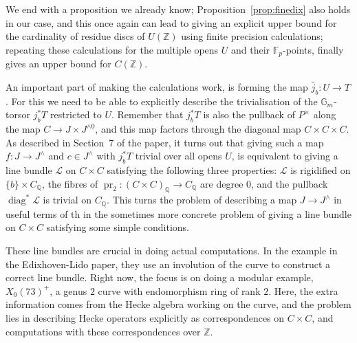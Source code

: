 \documentclass[12pt]{article}
\newcommand{\Z}{\mathbb{Z}}
\renewcommand{\G}{\mathbb{G}}
\newcommand{\Q}{\mathbb{Q}}
\newcommand{\Lcal}{\mathcal{L}}
\newcommand{\F}{\mathbb{F}}
\DeclareMathOperator{\pr}{pr}
\DeclareMathOperator{\diag}{diag}
\theoremstyle{plain}
\theoremstyle{definition}
\theoremstyle{remark}
\begin{document}
We end with a proposition we already know; Proposition~\ref{prop:finedix} also holds in our case, and this once again can lead to giving an explicit upper bound for the cardinality of residue discs of $U(\Z)$ using finite precision calculations; repeating these calculations for the multiple opens $U$ and their $\F_p$-points, finally gives an upper bound for $C(\Z)$.

An important part of making the calculations work, is forming the map $\tilde{j_b}: U \to T$. For this we need to be able to explicitly describe the trivialisation of the $\G_m$-torsor $j_b^* T$ restricted to $U$. Remember that $j_b^* T$ is also the pullback of $P^\times$ along the map $C \to J \times J^{\wedge 0}$, and this map factors through the diagonal map $C \times C\times C$. As described in Section~7 of the paper, it turns out that giving such a map $f: J \to J^{\wedge}$ and $c \in J^\wedge$ with $j_b^* T$ trivial over all opens $U$, is equivalent to giving a line bundle $\Lcal$ on $C \times C$ satisfying the following three properties: $\Lcal$ is rigidified on $\{b\} \times C_\Q$, the fibres of $\pr_2: (C \times C)_\Q \to C_\Q$ are degree $0$, and the pullback $\diag^* \Lcal$ is trivial on $C_\Q$. This turns the problem of describing a map $J \to J^\wedge$ in useful terms of th in the sometimes more concrete problem of giving a line bundle on $C \times C$ satisfying some simple conditions.

These line bundles are crucial in doing actual computations. In the example in the Edixhoven-Lido paper, they use an involution of the curve to construct a correct line bundle. Right now, the focus is on doing a modular example, $X_0(73)^+$, a genus $2$ curve with endomorphism ring of rank $2$. Here, the extra information comes from the Hecke algebra working on the curve, and the problem lies in describing Hecke operators explicitly as correspondences on $C \times C$, and computations with these correspondences over $\Z$. 


\newpage


\end{document}
